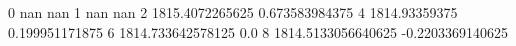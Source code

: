 0 nan nan
1 nan nan
2 1815.4072265625 0.673583984375
4 1814.93359375 0.199951171875
6 1814.733642578125 0.0
8 1814.5133056640625 -0.2203369140625
